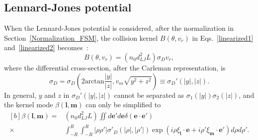 \subsection{Lennard-Jones potential}\label{linear_LJ_FSM}

When the Lennard-Jones potential is considered, after the normalization in Section~\ref{Normalization_FSM}, the collision kernel $B(\theta,v_r)$ in Eqs.~\eqref{linearized1} and~\eqref{linearized2} becomes~\cite{wuPoF2015}:
\begin{equation}\label{LJ_collision_kernel}
B(\theta,v_r)=(n_0d_{LJ}^2L)\sigma_Dv_r,
\end{equation} 
where the differential cross-section, after the Carleman representation, is
\begin{equation}
\sigma_D=\sigma_D\left(2\text{arctan}\frac{|y|}{|z|},v_m\sqrt{y^2+z^2}\right)\equiv\sigma_D'(|y|,|z|).
\end{equation}
In general, $y$ and $z$ in $\sigma_D'(|y|,|z|)$ cannot be separated as $\sigma_1(|y|)\sigma_2(|z|)$, and the kernel mode 
$\beta(\bm{l},\bm{m})$ can only be simplified to
\begin{equation}\label{kernel_LJ_mode00}
\begin{aligned}[b]
\beta(\bm{l},\bm{m})=&(n_0d_{LJ}^2L)\iint {}d\bm{e}'d\bm{e} \delta(\bm{e}\cdot{\bm{e}'})\\
\times&
\int_{-R}^R\int_{-R}^R|\rho\rho'|\sigma'_D(|\rho|,|\rho'|)\exp(i\rho\xi_{\bm{l}}\cdot{\bm{e}}+i\rho'\xi_{\bm{m}}\cdot{\bm{e}'})d\rho d\rho'.
\end{aligned}
\end{equation}



